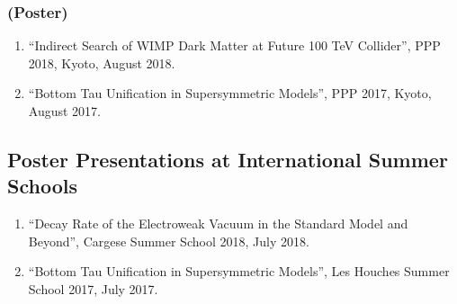 \documentclass[12pt,notitlepage]{article}
\begin{document}
\subsubsection*{(Poster)}

\begin{enumerate}
  \item ``Indirect Search of WIMP Dark Matter at Future 100 TeV Collider'', PPP 2018, Kyoto, August 2018.
  \item ``Bottom Tau Unification in Supersymmetric Models'', PPP 2017, Kyoto, August 2017.
\end{enumerate}

\subsection*{Poster Presentations at International Summer Schools}

\begin{enumerate}
  \item ``Decay Rate of the Electroweak Vacuum in the Standard Model and Beyond'', Cargese Summer School 2018, July 2018.
  \item ``Bottom Tau Unification in Supersymmetric Models'', Les Houches Summer School 2017, July 2017.
\end{enumerate}
\end{document}
